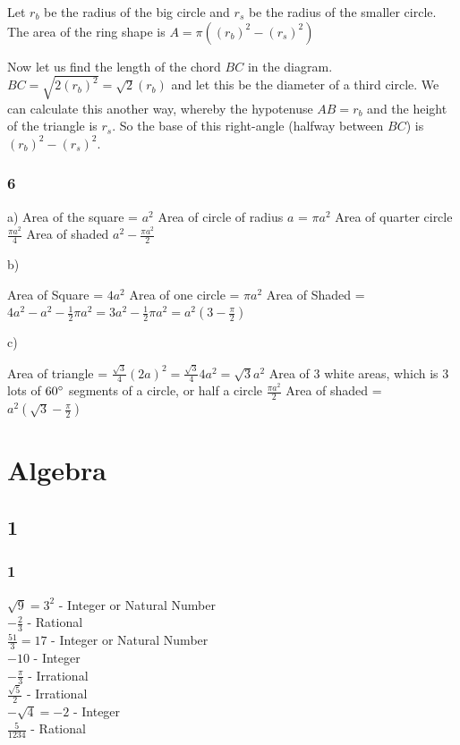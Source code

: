 \documentclass[]{report}
\begin{document}
	Let $r_b$ be the radius of the big circle and $r_s$ be the radius of the smaller circle. 
	The area of the ring shape is $A = \pi ((r_b)^2 - (r_s)^2)$

	Now let us find the length of the chord $BC$ in the diagram. $BC = \sqrt{2(r_b)^2} = \sqrt{2}(r_b)$ and let this be the diameter of a third circle. We can calculate this another way, whereby the hypotenuse $AB = r_b$ and the height of the triangle is $r_s$. So the base of this right-angle (halfway between $BC$) is $(r_b)^2 - (r_s)^2$.
	

\subsubsection{6}

a) 
Area of the square = $a^2$ 
Area of circle of radius $a$ = $\pi a^2$
Area of quarter circle $\frac{\pi a^2}{4}$
Area of shaded $a^2 - \frac{\pi a^2}{2}$

b)

Area of Square = $4a^2$
Area of one circle = $\pi a^2$
Area of Shaded = $4a^2 -a^2 - \frac{1}{2}\pi a^2 = 3a^2 - \frac{1}{2}\pi a^2 = a^2 (3 - \frac{\pi}{2})$


c)

Area of triangle = $\frac{\sqrt{3}}{4} (2a)^2 = \frac{\sqrt{3}}{4} 4a^2 = \sqrt{3}a^2$
Area of 3 white areas, which is 3 lots of $60\degree$ segments of a circle, or half a circle $\frac{\pi a^2}{2}$
Area of shaded = $a^2 (\sqrt{3} - \frac{\pi}{2})$

\section{Algebra}

\subsection{1}

\subsubsection{1}
$\sqrt{9} = 3^2$ - Integer or Natural Number\\
$-\frac{2}{3}$ - Rational \\
$ \frac{51}{3} = 17 $ - Integer or Natural Number \\
$ -10 $ - Integer \\
$ -\frac{\pi}{3} $ - Irrational \\
$ \frac{\sqrt{5}}{2} $ - Irrational \\
$ - \sqrt{4} = -2 $ - Integer \\
$ \frac{5}{1234} $ - Rational 
\end{document}
